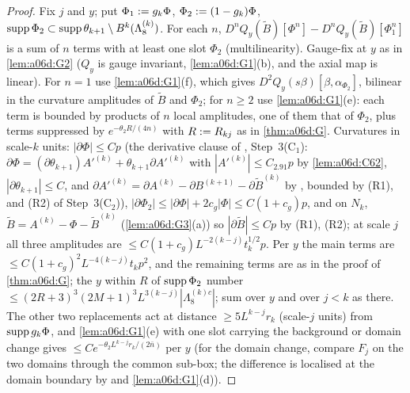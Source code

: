 \begin{proof}
Fix $j$ and $y$; put $\Phi_1:= g_k\Phi$, $\Phi_2:=(1-g_k)\Phi$, $\operatorname{supp}\Phi_2\subset\operatorname{supp}\theta_{k+1}\setminus B^k(\Lambda^{(k)}_8)$. For each $n$, $D^nQ_y(\tilde B)[\Phi^n]-D^nQ_y(\tilde B)[\Phi_1^n]$ is a sum of $n$ terms with at least one slot $\Phi_2$ (multilinearity). Gauge-fix at $y$ as in \cref{lem:a06d:G2} ($Q_y$ is gauge invariant, \cref{lem:a06d:G1}(b), and the axial map is linear). For $n=1$ use \cref{lem:a06d:G1}(f), which gives $D^2Q_y(s\beta)[\beta,\alpha_{\Phi_2}]$, bilinear in the curvature amplitudes of $\tilde B$ and $\Phi_2$; for $n\ge2$ use \cref{lem:a06d:G1}(e): each term is bounded by products of $n$ local amplitudes, one of them that of $\Phi_2$, plus terms suppressed by $e^{-\theta_2R/(4n)}$ with $R:= R_{kj}$ as in \cref{thm:a06d:G}. Curvatures in scale-$k$ units: $|\partial\Phi|\le Cp$ (the derivative clause of \cite[(2.91)]{Ba2}, Step~3(C$_1$): $\partial\Phi=(\partial\theta_{k+1})A'^{(k)}+\theta_{k+1}\partial A'^{(k)}$ with $|A'^{(k)}|\le C_{2.91}p$ by \cref{lem:a06d:C62}, $|\partial\theta_{k+1}|\le C$, and $\partial A'^{(k)}=\partial A^{(k)}-\partial B^{(k+1)}-\partial\tilde B^{(k)}$ by \cite[(2.89)]{Ba2}, bounded by (R1), \cite[(2.98)]{Ba2} and (R2) of Step~3(C$_2$)), $|\partial\Phi_2|\le|\partial\Phi|+2c_g|\Phi|\le C(1+c_g)p$, and on $N_k$, $\tilde B=A^{(k)}-\Phi-\tilde B^{(k)}$ (\cref{lem:a06d:G3}(a)) so $|\partial\tilde B|\le Cp$ by (R1), (R2); at scale $j$ all three amplitudes are $\le C(1+c_g)L^{-2(k-j)}t_k^{1/2}p$. Per $y$ the main terms are $\le C(1+c_g)^2L^{-4(k-j)}t_kp^2$, and the remaining terms are as in the proof of \cref{thm:a06d:G}; the $y$ within $R$ of $\operatorname{supp}\Phi_2$ number $\le(2R+3)^3(2M+1)^3L^{3(k-j)}|\Lambda^{(k)c}_8|$; sum over $y$ and over $j<k$ as there. The other two replacements act at distance $\ge5L^{k-j}r_k$ (scale-$j$ units) from $\operatorname{supp} g_k\Phi$, and \cref{lem:a06d:G1}(e) with one slot carrying the background or domain change gives $\le Ce^{-\theta_2L^{k-j}r_k/(2\bar n)}$ per $y$ (for the domain change, compare $F_j$ on the two domains through the common sub-box; the difference is localised at the domain boundary by \cite[(2.29)]{Ba1} and \cref{lem:a06d:G1}(d)).
\end{proof}
